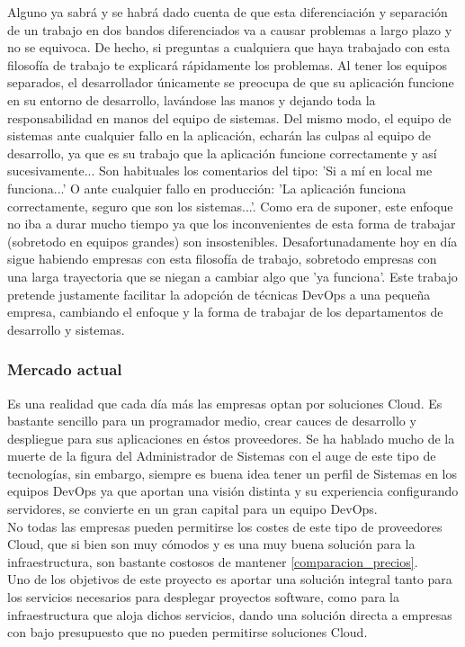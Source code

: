 \begin{text}
		Alguno ya sabrá y se habrá dado cuenta de que esta diferenciación y separación de un trabajo en dos bandos diferenciados va a causar problemas a largo plazo y no se equivoca. De hecho, si preguntas a cualquiera que haya trabajado con esta filosofía de trabajo te explicará rápidamente los problemas. Al tener los equipos separados, el desarrollador únicamente se preocupa de que su aplicación funcione en su entorno de desarrollo, lavándose las manos y dejando toda la responsabilidad en manos del equipo de sistemas. Del mismo modo, el equipo de sistemas ante cualquier fallo en la aplicación, echarán las culpas al equipo de desarrollo, ya que es su trabajo que la aplicación funcione correctamente y así sucesivamente... Son habituales los comentarios del tipo: 'Si a mí en local me funciona...' O ante cualquier fallo en producción: 'La aplicación funciona correctamente, seguro que son los sistemas...'. Como era de suponer, este enfoque no iba a durar mucho tiempo ya que los inconvenientes de esta forma de trabajar (sobretodo en equipos grandes) son insostenibles. Desafortunadamente hoy en día sigue habiendo empresas con esta filosofía de trabajo, sobretodo empresas con una larga trayectoria que se niegan a cambiar algo que 'ya funciona'. Este trabajo pretende justamente facilitar la adopción de técnicas DevOps a una pequeña empresa, cambiando el enfoque y la forma de trabajar de los departamentos de desarrollo y sistemas.
	\end{text}
	
	\subsubsection{Mercado actual}
		\begin{text}
			Es una realidad que cada día más las empresas optan por soluciones Cloud. Es bastante sencillo para un programador medio, crear cauces de desarrollo y despliegue para sus aplicaciones en éstos proveedores. Se ha hablado mucho de la muerte de la figura del Administrador de Sistemas con el auge de este tipo de tecnologías, sin embargo, siempre es buena idea tener un perfil de Sistemas en los equipos DevOps ya que aportan una visión distinta y su experiencia configurando servidores, se convierte en un gran capital para un equipo DevOps. \\ 
			No todas las empresas pueden permitirse los costes de este tipo de proveedores Cloud, que si bien son muy cómodos y es una muy buena solución para la infraestructura, son bastante costosos de mantener \ref{comparacion_precios}. \\
			Uno de los objetivos de este proyecto es aportar una solución integral tanto para los servicios necesarios para desplegar proyectos software, como para la infraestructura que aloja dichos servicios, dando una solución directa a empresas con bajo presupuesto que no pueden permitirse soluciones Cloud. \\
		\end{text}
	
